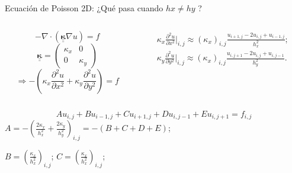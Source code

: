 \documentclass{beamer}
\newcommand{\Tensor}[1]{{\underline{\underline{\mathbf{#1}}}}}
\begin{document}
\begin{frame}{Ecuaci\'on de Poisson 2D: ¿Qué pasa cuando $hx \neq hy$ ?}

\begin{columns}
	\begin{column}{0.45\textwidth}
		\begin{small}
		\[
		-\nabla \cdot \left(\Tensor{\kappa} \nabla u \right) =  f
		\]
		\[
		\Tensor{\kappa} = 
		\left(\begin{array}{cc}
		\kappa_x & 0 \\
		0 & \kappa_y
		\end{array}\right)
		\]
		\[ \Longrightarrow
		-\left(\kappa_x \frac{\partial^2 u}{\partial x^2} + \kappa_y \frac{\partial^2 u}{\partial y^2}\right) = f
		\]
		\end{small}
	\end{column}
	\begin{column}{0.55\textwidth}
{\small 	
	\begin{eqnarray*}
		\kappa_x\frac{\partial^2 u}{\partial x^2}\Big|_{i,j} \approx \left(\kappa_x\right)_{i,j} \frac{u_{i+1,j} - 2 u_{i,j} + u_{i-1,j}}{h_x^2}; \\
		\kappa_y\frac{\partial^2 u}{\partial y^2}\Big|_{i,j} \approx \left(\kappa_x\right)_{i,j} \frac{u_{i,j+1} - 2 u_{i,j} + u_{i,j-1}}{h_y^2}.
	\end{eqnarray*}}
	\end{column}
\end{columns}

\begin{columns}
	\begin{column}{0.65\textwidth}
\begin{footnotesize}
	\[
	\boxed{A u_{i,j} + B u_{i-1,j} + C u_{i+1,j} + D u_{i,j-1} + E u_{i,j+1} = f_{i,j}}
	\]
	$\displaystyle A = -\left(\frac{2 \kappa_x}{h_x^2} + \frac{2 \kappa_y}{h_y^2}\right)_{i,j} = -(B + C + D + E)$;
	
	$\displaystyle B = \left(\frac{\kappa_x}{h_x^2}\right)_{i,j}$; 
	$\displaystyle C = \left(\frac{\kappa_x}{h_x^2}\right)_{i,j}$; 
	

\end{footnotesize}
\end{column}
\end{columns}
\end{frame}
\end{document}
